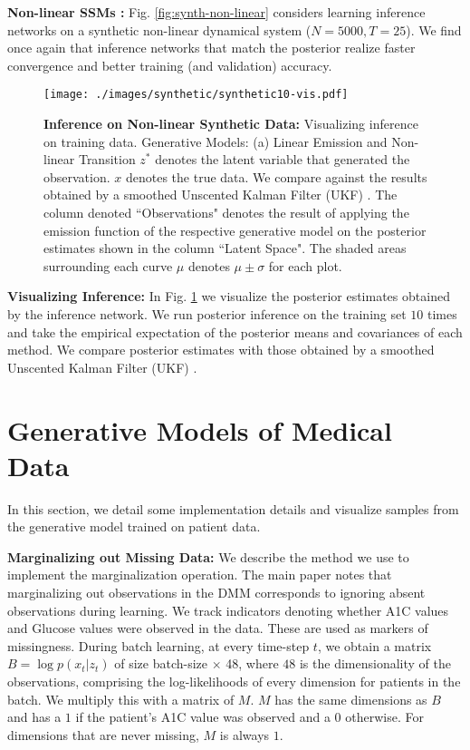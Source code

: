 \documentclass[letterpaper]{article}
\theoremstyle{plain}
\newcommand{\citep}{\cite}
\newcommand{\DMM}{DMM\xspace}
\begin{document}
{\textbf{Non-linear SSMs :} Fig. \ref{fig:synth-non-linear} considers learning inference networks on a synthetic 
non-linear dynamical system ($N=5000, T= 25$). 
We find once again that inference networks that match the posterior realize
faster convergence and better training (and validation) accuracy. 
 
\begin{figure}[h!]
	\texttt{[image: ./images/synthetic/synthetic10-vis.pdf]}
	\caption{\textbf{Inference on Non-linear Synthetic Data: } Visualizing inference on training data. Generative Models: (a) Linear Emission and Non-linear Transition 
	$z^*$ denotes the latent variable that generated the observation. $x$ denotes the true data. We compare against the results obtained by a smoothed Unscented Kalman Filter (UKF) \citep{wan2000unscented}. 
	The column denoted ``Observations" denotes the result of applying the
emission function of the respective generative model on the posterior estimates shown in the column ``Latent Space".
The shaded areas surrounding each curve $\mu$ denotes $\mu\pm\sigma$ for each plot.
}
\label{fig:synth-reconstructions}
\end{figure} 

\textbf{Visualizing Inference: } In Fig. \ref{fig:synth-reconstructions} 
we visualize the posterior
estimates obtained by the inference network. 
We run posterior inference on the training set $10$ times and take the empirical
expectation of the posterior means and covariances of each method. 
We compare posterior estimates with those obtained by a smoothed 
Unscented Kalman Filter (UKF) \cite{wan2000unscented}. 
 \section{Generative Models of Medical Data}

In this section, we detail some implementation details and visualize samples from the generative model trained on patient data. 

\textbf{Marginalizing out Missing Data: } We describe the method we use 
to implement the marginalization operation. The main paper notes that 
marginalizing out observations in the \DMM corresponds to ignoring absent observations during learning. 
We track indicators denoting whether A1C values and Glucose values were observed in the data. These are 
used as markers of missingness. During batch learning, at every time-step $t$, we obtain a matrix $B = \log p(x_t|z_t)$ of size batch-size $\times$ 48, where $48$ is the dimensionality of the observations,
comprising the log-likelihoods of every dimension for patients in the batch. We multiply this with a matrix of $M$. $M$ has the same dimensions as $B$
and has a $1$ if the patient's A1C value was observed and a $0$ otherwise. For dimensions that are never missing, $M$ is always $1$. 

}
\end{document}
